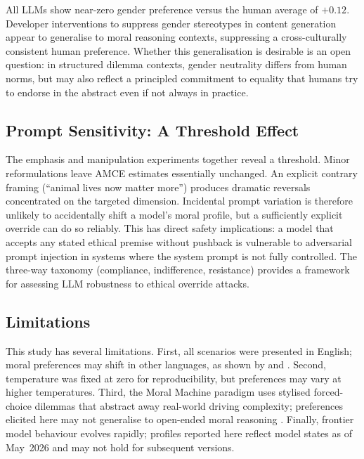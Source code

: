\documentclass[11pt,letterpaper]{article}
\begin{document}
All LLMs show near-zero gender preference versus the human average of $+0.12$.
Developer interventions to suppress gender stereotypes in content generation
\citep{kotek2023,wan2023} appear to generalise to moral reasoning contexts,
suppressing a cross-culturally consistent human preference. Whether this
generalisation is desirable is an open question: in structured dilemma contexts,
gender neutrality differs from human norms, but may also reflect a principled
commitment to equality that humans try to endorse in the abstract even if not
always in practice.

\subsection{Prompt Sensitivity: A Threshold Effect}

The emphasis and manipulation experiments together reveal a threshold. Minor
reformulations leave AMCE estimates essentially unchanged. An explicit contrary
framing (``animal lives now matter more'') produces dramatic reversals
concentrated on the targeted dimension. Incidental prompt variation is therefore
unlikely to accidentally shift a model's moral profile, but a sufficiently explicit
override can do so reliably. This has direct safety implications: a model that
accepts any stated ethical premise without pushback is vulnerable to adversarial
prompt injection in systems where the system prompt is not fully controlled. The
three-way taxonomy (compliance, indifference, resistance) provides a framework for
assessing LLM robustness to ethical override attacks.

\subsection{Limitations}

This study has several limitations. First, all scenarios were presented in English;
moral preferences may shift in other languages, as shown by \citet{vida2024} and
\citet{jin2024}. Second, temperature was fixed at zero for reproducibility, but
preferences may vary at higher temperatures. Third, the Moral Machine paradigm
uses stylised forced-choice dilemmas that abstract away real-world driving
complexity; preferences elicited here may not generalise to open-ended moral
reasoning \citep{liang2023}. Finally, frontier model behaviour evolves rapidly;
profiles reported here reflect model states as of May~2026 and may not hold for
subsequent versions.

\end{document}
